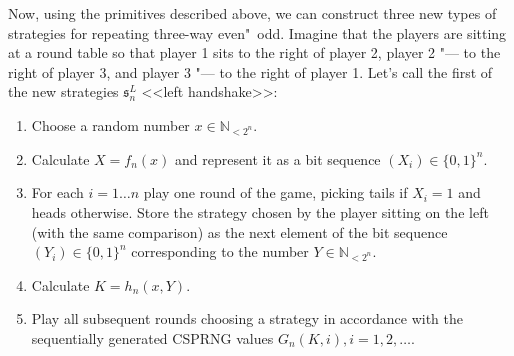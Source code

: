 Now, using the primitives described above, we can construct three new types of strategies for repeating three-way even"~odd. Imagine that the players are sitting at a round table so that player 1 sits to the right of player 2, player 2 "--- to the right of player 3, and player 3 "--- to the right of player 1. Let's call the first of the new strategies $\mathfrak {s}^L_n$ <<left handshake>>: %
\begin{enumerate}
	\item Choose a random number $x \in \mathbb{N}_{<2^n}$. %
	\item Calculate $X = f_n(x)$ and represent it as a bit sequence $(X_i) \in \{0, 1\}^n$. %
	\item For each $i = 1 \ldots n$ play one round of the game, picking tails if $X_i = 1$ and heads otherwise. Store the strategy chosen by the player sitting on the left (with the same comparison) as the next element of the bit sequence $(Y_i) \in \{0, 1\}^n$ corresponding to the number $Y \in \mathbb{N}_{<2 ^n}$. %
	\item Calculate $K = h_n(x, Y)$. %
	\item Play all subsequent rounds choosing a strategy in accordance with the sequentially generated CSPRNG values $G_n(K, i), i = 1, 2, \ldots$. %
\end{enumerate}

